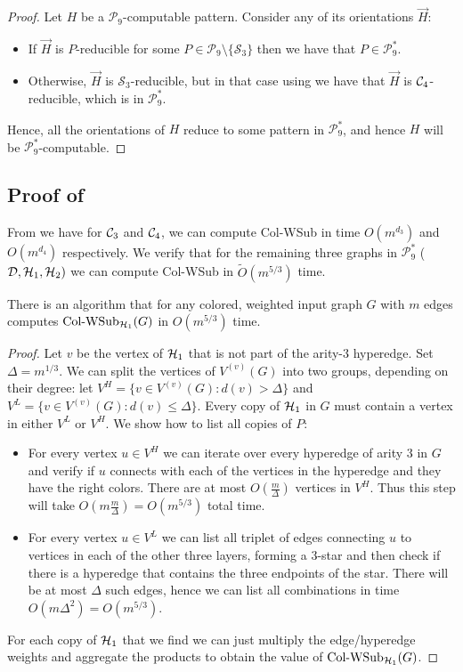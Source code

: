 \documentclass[a4paper,UKenglish,cleveref, autoref, numberwithinsect, thm-restate]{lipics-v2021}
\newcommand{\reducible}[1]{${#1}$-reducible}
\newcommand{\computable}[1]{${#1}$-computable}
\newcommand{\cycle}[1]{\cC_{#1}}
\newcommand{\simplex}[1]{\cS_{#1}}
\newcommand{\hyperone}{\cH_1}
\newcommand{\hypertwo}{\cH_2}
\newcommand{\diamondgraph}{\cD}
\newcommand{\WSub}[2]{\mathrm{\text{Col-WSub}}_{#2}(#1)}
\newcommand{\cC}{{\cal C}}
\newcommand{\cD}{\mathcal{D}}
\newcommand{\cH}{{\cal H}}
\newcommand{\cP}{\mathcal{P}}
\newcommand{\cS}{\mathcal{S}}
\begin{document}
	\ninestar*
	\begin{proof}
		Let $H$ be a \computable{\cP_9} pattern. Consider any of its orientations $\vec{H}$:
		\begin{itemize}
			\item If $\vec{H}$ is \reducible{P} for some $P \in \cP_9 \setminus \{\simplex{3}\}$ then we have that $P \in \cP^*_9$.
			\item Otherwise, $\vec{H}$ is \reducible{\simplex{3}}, but in that case using  we have that $\vec{H}$ is \reducible{\cycle{4}}, which is in $\cP^*_9$.
		\end{itemize}
		Hence, all the orientations of $H$ reduce to some pattern in $\cP^*_9$, and hence $H$ will be \computable{\cP^*_9}.
	\end{proof}
	
	\subsection{Proof of }
	
	From  we have for $\cycle{3}$ and $\cycle{4}$, we can compute Col-WSub in time $O(m^{d_3})$ and $O(m^{d_4})$ respectively. We verify that for the remaining three graphs in $\cP^*_9$ ($\diamondgraph, \hyperone, \hypertwo)$ we can compute Col-WSub in $\tilde{O}(m^{5/3})$ time.
	
	\begin{lemma}
		There is an algorithm that for any colored, weighted input graph $G$ with $m$ edges computes $\WSub{G}{\hyperone}$ in $O(m^{5/3})$ time.
	\end{lemma}
	\begin{proof}
		Let $v$ be the vertex of $\hyperone$ that is not part of the arity-$3$ hyperedge. Set $\Delta = m^{1/3}$. We can split the vertices of $V^{(v)}(G)$ into two groups, depending on their degree: let $V^H = \{v \in V^{(v)}(G) : d(v) > \Delta\}$ and $V^L = \{v \in V^{(v)}(G) : d(v) \leq \Delta\}$. Every copy of $\hyperone$ in $G$ must contain a vertex in either $V^L$ or $V^H$. We show how to list all copies of $P$:
		
		\begin{itemize}
			\item For every vertex $u \in V^H$ we can iterate over every hyperedge of arity $3$ in $G$ and verify if $u$ connects with each of the vertices in the hyperedge and they have the right colors. There are at most $O(\frac{m}{\Delta})$ vertices in $V^H$. Thus this step will take $O(m\frac{m}\Delta) = O(m^{5/3})$ total time.
			\item For every vertex $u \in V^L$ we can list all triplet of edges connecting $u$ to vertices in each of the other three layers, forming a 3-star and then check if there is a hyperedge that contains the three endpoints of the star. There will be at most $\Delta$ such edges, hence we can list all combinations in time $O(m \Delta^2) = O(m^{5/3})$.
		\end{itemize}
		For each copy of $\hyperone$ that we find we can just multiply the edge/hyperedge weights and aggregate the products to obtain the value of $\WSub{G}{\hyperone}$.
	\end{proof}
\end{document}
